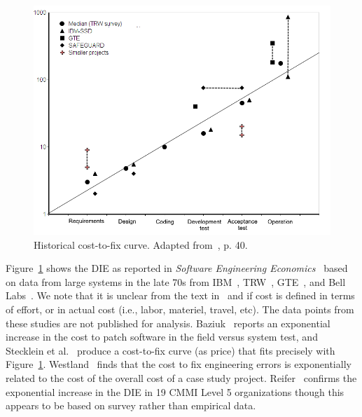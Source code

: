 \documentclass[smallcondensed]{svjour3}
\newcommand{\fig}[1]{Figure~\ref{fig:#1}}
\begin{document}
\begin{figure}[!t]
\begin{center}\includegraphics[width=4.5in]{boehm81.png}\end{center}
 \caption{Historical cost-to-fix curve. Adapted from~\cite{Boehm81}, p. 40.}\label{fig:cost-to-fix}
 \end{figure}

Figure~\ref{fig:cost-to-fix} shows the DIE as reported in \textit{Software Engineering Economics}~\cite{Boehm81} based on data from large systems in the late 70s from IBM~\cite{Fagan76}, TRW~\cite{Boehm76}, GTE~\cite{Daly77}, and Bell Labs~\cite{Stephenson76}. 
We note that it is unclear from the text in~\cite{Daly77} and \cite{Boehm76} if cost is defined in terms of effort, or in actual cost (i.e., labor, materiel, travel, etc). The data points from these studies are not published for analysis.
Baziuk~\cite{baziuk1995bnr} reports an exponential increase in the cost to patch software in the field versus system test, and Stecklein et al.~\cite{steck04} produce a cost-to-fix curve (as price) that fits precisely with \fig{cost-to-fix}. Westland~\cite{westland2002cost} finds that the cost to fix engineering errors is exponentially related to the cost of the overall cost of a case study project. Reifer~\cite{reifer2007profiles} confirms the exponential increase in the DIE in 19 CMMI Level 5 organizations though this appears to be based on survey rather than empirical data. 
\end{document}
